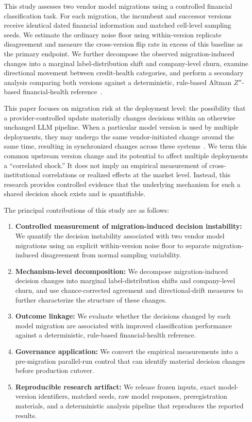 \documentclass{ieeeaccess}
\begin{document}
This study assesses two vendor model migrations using a controlled financial classification task. For each migration, the incumbent and successor versions receive identical dated financial information and matched cell-level sampling seeds. We estimate the ordinary noise floor using within-version replicate disagreement and measure the cross-version flip rate in excess of this baseline as the primary endpoint. We further decompose the observed migration-induced changes into a marginal label-distribution shift and company-level churn, examine directional movement between credit-health categories, and perform a secondary analysis comparing both versions against a deterministic, rule-based Altman $Z''$-based financial-health reference~\cite{altman,altman_em}.

This paper focuses on migration risk at the deployment level: the possibility that a provider-controlled update materially changes decisions within an otherwise unchanged LLM pipeline. When a particular model version is used by multiple deployments, they may undergo the same vendor-initiated change around the same time, resulting in synchronized changes across these systems~\cite{kim,systemic,homog,esrb}. We term this common upstream version change and its potential to affect multiple deployments a ``correlated shock.'' It does not imply an empirical measurement of cross-institutional correlations or realized effects at the market level. Instead, this research provides controlled evidence that the underlying mechanism for such a shared decision shock exists and is quantifiable.

The principal contributions of this study are as follows:
\begin{enumerate}
\item \textbf{Controlled measurement of migration-induced decision instability:} We quantify the decision instability associated with two vendor model migrations using an explicit within-version noise floor to separate migration-induced disagreement from normal sampling variability.
\item \textbf{Mechanism-level decomposition:} We decompose migration-induced decision changes into marginal label-distribution shifts and company-level churn, and use chance-corrected agreement and directional-drift measures to further characterize the structure of these changes.
\item \textbf{Outcome linkage:} We evaluate whether the decisions changed by each model migration are associated with improved classification performance against a deterministic, rule-based financial-health reference.
\item \textbf{Governance application:} We convert the empirical measurements into a pre-migration parallel-run control that can identify material decision changes before production cutover.
\item \textbf{Reproducible research artifact:} We release frozen inputs, exact model-version identifiers, matched seeds, raw model responses, preregistration materials, and a deterministic analysis pipeline that reproduces the reported results.
\end{enumerate}
\end{document}
